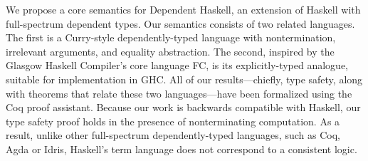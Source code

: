 We propose a core semantics for Dependent Haskell, an extension of Haskell
with full-spectrum dependent types. Our semantics consists of two related
languages. The first is a Curry-style dependently-typed language with
nontermination, irrelevant arguments, and equality abstraction. The second,
inspired by the Glasgow Haskell Compiler's core language FC, is its
explicitly-typed analogue, suitable for implementation in GHC. All of our
results---chiefly, type safety, along with theorems that relate these two
languages---have been formalized using the Coq proof assistant. Because our
work is backwards compatible with Haskell, our type safety proof holds in the
presence of nonterminating computation. As a result, unlike other
full-spectrum dependently-typed languages, such as Coq, Agda or Idris,
Haskell's term language does not correspond to a consistent logic.
